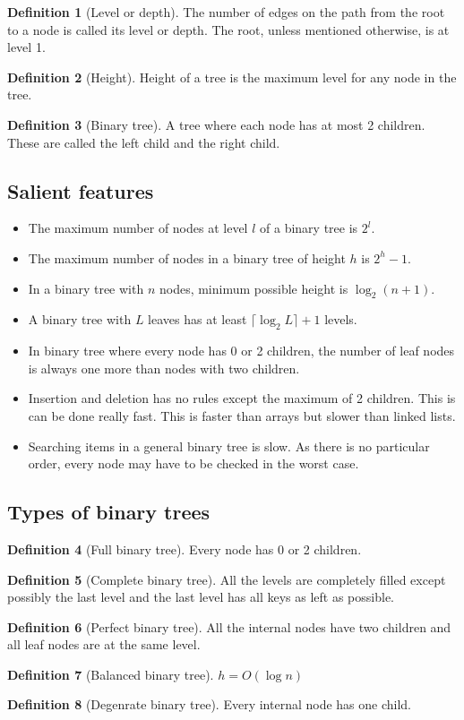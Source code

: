 \documentclass[10pt, a4paper]{extarticle}
\theoremstyle{definition}
\newtheorem{defn}{Definition}
\begin{document}
	\begin{defn}[Level or depth]
		The number of edges on the path from the root to a node is called its level or depth. The root, unless mentioned otherwise, is at level 1.
	\end{defn}

	\begin{defn}[Height]
		Height of a tree is the maximum level for any node in the tree.
	\end{defn}
	\begin{defn}[Binary tree]
		A tree where each node has at most 2 children. These are called the left child and the right child.
	\end{defn}
	\subsection{Salient features}
	\begin{itemize}
		\item The maximum number of nodes at level $l$ of a binary tree is $2^l$. 
		\item The maximum number of nodes in a binary tree of height $h$ is $2^h-1$.
		\item In a binary tree with $n$ nodes, minimum possible height is $\log_2(n+1)$.
		\item A binary tree with $L$ leaves has at least $\lceil\log_2L\rceil+1$ levels.
		\item In binary tree where every node has 0 or 2 children, the number of leaf nodes is always one more than nodes with two children.
		\item Insertion and deletion has no rules except the maximum of 2 children. This is can be done really fast. This is faster than arrays but slower than linked lists.
		\item Searching items in a general binary tree is slow. As there is no particular order, every node may have to be checked in the worst case. 
	\end{itemize}
	\subsection{Types of binary trees}
	\begin{defn}[Full binary tree]
		Every node has 0 or 2 children.
	\end{defn}
	\begin{defn}[Complete binary tree]
		All the levels are completely filled except possibly the last level and the last level has all keys as left as possible. 
	\end{defn}
	\begin{defn}[Perfect binary tree]
		All the internal nodes have two children and all leaf nodes are at the same level. 
	\end{defn}
	\begin{defn}[Balanced binary tree]
		$h=O(\log n)$
	\end{defn}
	\begin{defn}[Degenrate binary tree]
	Every internal node has one child.
	\end{defn}
\end{document}
